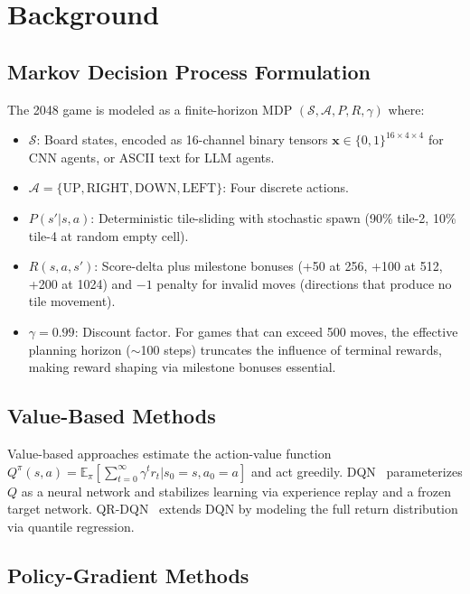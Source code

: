 \documentclass[letterpaper]{article}
\begin{document}
\section{Background}
\label{sec:background}

\subsection{Markov Decision Process Formulation}

The 2048 game is modeled as a finite-horizon MDP $(\mathcal{S}, \mathcal{A}, P, R, \gamma)$ where:
\begin{itemize}
    \item $\mathcal{S}$: Board states, encoded as 16-channel binary tensors $\mathbf{x}\in\{0,1\}^{16\times4\times4}$ for CNN agents, or ASCII text for LLM agents.
    \item $\mathcal{A} = \{\text{UP}, \text{RIGHT}, \text{DOWN}, \text{LEFT}\}$: Four discrete actions.
    \item $P(s'|s,a)$: Deterministic tile-sliding with stochastic spawn (90\% tile-2, 10\% tile-4 at random empty cell).
    \item $R(s,a,s')$: Score-delta plus milestone bonuses (+50 at 256, +100 at 512, +200 at 1024) and $-1$ penalty for invalid moves (directions that produce no tile movement).
    \item $\gamma = 0.99$: Discount factor. For games that can exceed 500 moves, the effective planning horizon ($\sim$100 steps) truncates the influence of terminal rewards, making reward shaping via milestone bonuses essential.
\end{itemize}

\subsection{Value-Based Methods}

Value-based approaches estimate the action-value function $Q^\pi(s,a) = \mathbb{E}_\pi[\sum_{t=0}^\infty \gamma^t r_t | s_0=s, a_0=a]$ and act greedily. DQN~\cite{mnih2015human} parameterizes $Q$ as a neural network and stabilizes learning via experience replay and a frozen target network. QR-DQN~\cite{dabney2018distributional} extends DQN by modeling the full return distribution via quantile regression.

\subsection{Policy-Gradient Methods}
\end{document}
